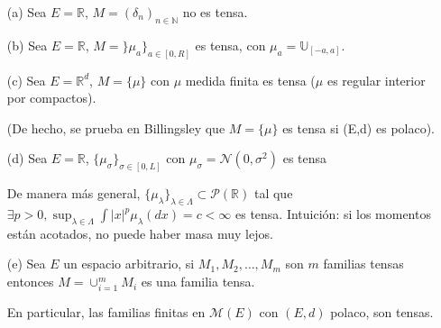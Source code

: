 \begin{example} %
\label{ejemplo:1_2_3}
\beforeitemize
\begin{itemize}
    \item[(a)] Sea $E=\mathbb{R}$, $M=(\delta_n)_{n\in\mathbb{N}}$ no es tensa.
    \item[(b)] Sea $E=\mathbb{R}$, $M=\}\mu_a\}_{a\in[0,R]}$ es tensa, con $\mu_a=\mathbb{U}_{[-a,a]}$.
    \item[(c)] Sea $E=\mathbb{R}^d$, $M=\{\mu\}$ con $\mu$ medida finita es tensa ($\mu$ es regular interior por compactos).
    
    (De hecho, se prueba en Billingsley \cite{billing} que $M=\{\mu\}$ es tensa si (E,d) es polaco).
    \item[(d)] Sea $E=\mathbb{R}$, $\{\mu_\sigma\}_{\sigma\in[0,L]}$ con $\mu_\sigma=\mathcal{N}(0,\sigma^2)$ es tensa
    
    De manera más general, $\{\mu_\lambda\}_{\lambda\in\Lambda}\subset \mathcal{P}(\mathbb{R})$ tal que $\exists p>0, \displaystyle\sup_{\lambda\in\Lambda}\int|x|^p\mu_\lambda(dx)=c<\infty$ es tensa. Intuición: si los momentos están acotados, no puede haber masa muy lejos.
    \item[(e)] Sea $E$ un espacio arbitrario, si $M_1,M_2,\dots,M_m$ son $m$ familias tensas entonces $M=\displaystyle\cup^m_{i=1}M_i$ es una familia tensa.
    
    En particular, las familias finitas en $\mathcal{M}(E)$ con $(E,d)$ polaco, son tensas.
\end{itemize}
\end{example}
